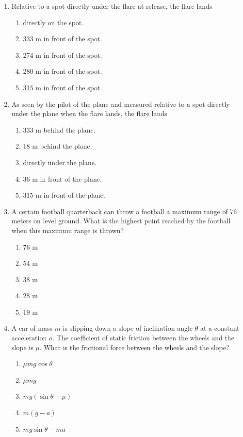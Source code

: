 \documentclass[12pt,letterpaper]{article}
\begin{document}
\begin{enumerate}[resume]
\item
Relative to a spot directly under the flare at release, the flare lands
\begin{enumerate}
\item directly on the spot.
\item 333 m in front of the spot.
\item 274 m in front of the spot.
\item 280 m in front of the spot.
\item 315 m in front of the spot.
\end{enumerate}

\item
As seen by the pilot of the plane and measured relative to a spot directly under the plane when the flare lands, the flare lands
\begin{enumerate}
\item 333 m behind the plane.
\item 18 m behind the plane.
\item directly under the plane.
\item 36 m in front of the plane.
\item 315 m in front of the plane.
\end{enumerate}

\vfill
\newpage

\item
A certain football quarterback can throw a football a maximum range of 76 meters on level ground. What is the highest point reached by the football when this maximum range is thrown?
\begin{enumerate}
\item 76 m
\item 54 m
\item 38 m
\item 28 m
\item 19 m
\end{enumerate}

\item
A car of mass $m$ is slipping down a slope of inclination angle $\theta$ at a constant acceleration $a$. The coefficient of static friction between the wheels and the slope is $\mu$. What is the frictional force between the wheels and the slope?
\begin{enumerate}
\item $\mu mg\cos\theta$
\item $\mu mg$
\item $mg\left(\sin\theta-\mu\right)$
\item $m\left(g-a\right)$
\item $mg\sin\theta-ma$
\end{enumerate}


\end{enumerate}
\end{document}
